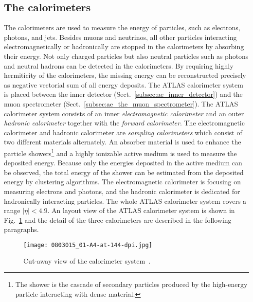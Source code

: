 
\subsection{The calorimeters}
\label{subsec:ae_calorimeter}
The calorimeters are used to measure the energy of particles, such as electrons, photons, and jets.
Besides muons and neutrinos, all other particles interacting electromagnetically or hadronically are stopped in the calorimeters by absorbing their energy.
Not only charged particles but also neutral particles such as photons and neutral hadrons can be detected in the calorimeters.
By requiring highly hermiticity of the calorimeters, the missing energy \met can be reconstructed precisely as negative vectorial sum of all energy deposits.
The ATLAS calorimeter system is placed between the inner detector (Sect.~\ref{subsec:ae_inner_detector}) and the muon spectrometer (Sect.~\ref{subsec:ae_the_muon_spectrometer}).
The ATLAS calorimeter system consists of an inner \textit{electromagnetic calorimeter} and an outer \textit{hadronic calorimeter} together with the \textit{forward calorimeter}.
The electromagnetic calorimeter and hadronic calorimeter are \textit{sampling calorimeters} which consist of two different materials alternately.
An absorber material is used to enhance the particle showers\footnote{The shower is the cascade of secondary particles produced by the high-energy particle interacting with dense material.} and a highly ionizable active medium is used to measure the deposited energy.
Because only the energies deposited in the active medium can be observed, the total energy of the shower can be estimated from the deposited energy by clustering algorithms.
The electromagnetic calorimeter is focusing on measuring electrons and photons, and the hadronic calorimeter is dedicated for hadronically interacting particles.
The whole ATLAS calorimeter system covers a range $|\eta| < 4.9$.
An layout view of the ATLAS calorimeter system is shown in Fig.~\ref{fig:ae_calorimeter} and the detail of the three calorimeters are described in the following paragraphs.

\begin{figure}[htbp]
    \begin{center}
        \texttt{[image: 0803015\_01-A4-at-144-dpi.jpg]}
        \caption{Cut-away view of the calorimeter system~\cite{Aad:2008zzm}.}
        \label{fig:ae_calorimeter}
    \end{center}
\end{figure}

